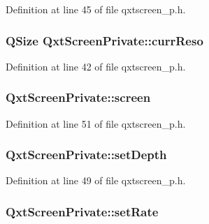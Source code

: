Definition at line 45 of file qxtscreen\-\_\-p.\-h.

\hypertarget{class_qxt_screen_private_aa02abef2ca59565f140c97c1b9c42eb0}{
\subsubsection[{curr\-Reso}]{\setlength{\rightskip}{0pt plus 5cm}Q\-Size Qxt\-Screen\-Private\-::curr\-Reso}}\label{class_qxt_screen_private_aa02abef2ca59565f140c97c1b9c42eb0}


Definition at line 42 of file qxtscreen\-\_\-p.\-h.

\hypertarget{class_qxt_screen_private_ae03501b1a6e55c314aac168f1377bf2a}{
\subsubsection[{screen}]{ Qxt\-Screen\-Private\-::screen}}\label{class_qxt_screen_private_ae03501b1a6e55c314aac168f1377bf2a}


Definition at line 51 of file qxtscreen\-\_\-p.\-h.

\hypertarget{class_qxt_screen_private_afd1f011ce0f1097b9f3853c4525f0212}{
\subsubsection[{set\-Depth}]{ Qxt\-Screen\-Private\-::set\-Depth}}\label{class_qxt_screen_private_afd1f011ce0f1097b9f3853c4525f0212}


Definition at line 49 of file qxtscreen\-\_\-p.\-h.

\hypertarget{class_qxt_screen_private_ae809a89ab77be917f65ba9426f4a5555}{
\subsubsection[{set\-Rate}]{ Qxt\-Screen\-Private\-::set\-Rate}}\label{class_qxt_screen_private_ae809a89ab77be917f65ba9426f4a5555}


